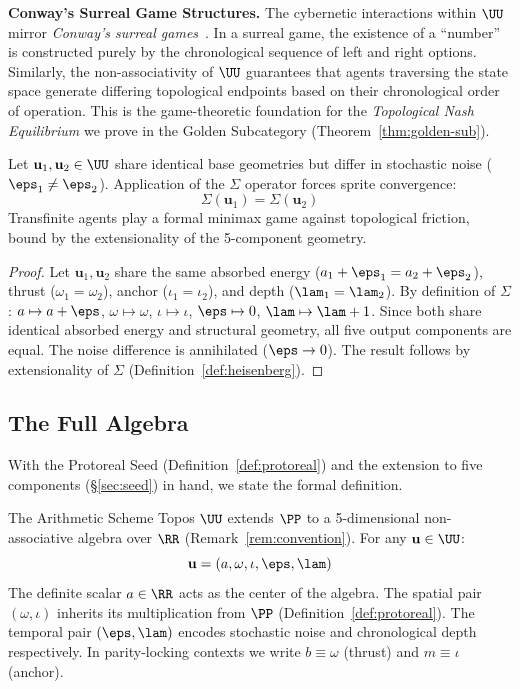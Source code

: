 \textbf{Conway's Surreal Game Structures.} The cybernetic interactions within $\UU$ mirror \emph{Conway's surreal games}~\cite{conway}. In a surreal game, the existence of a ``number'' is constructed purely by the chronological sequence of left and right options. Similarly, the non-associativity of $\UU$ guarantees that agents traversing the state space generate differing topological endpoints based on their chronological order of operation. This is the game-theoretic foundation for the \emph{Topological Nash Equilibrium} we prove in the Golden Subcategory (Theorem~\ref{thm:golden-sub}).

\begin{theorem}\label{thm:game-ext}
Let $\mathbf{u}_1, \mathbf{u}_2 \in \UU$ share identical base geometries but differ in stochastic noise ($\eps_1 \neq \eps_2$). Application of the $\Sigma$ operator forces sprite convergence:
$$\Sigma(\mathbf{u}_1) = \Sigma(\mathbf{u}_2)$$
Transfinite agents play a formal minimax game against topological friction, bound by the extensionality of the 5-component geometry.
\end{theorem}

\begin{proof}
Let $\mathbf{u}_1, \mathbf{u}_2$ share the same absorbed energy ($a_1 + \eps_1 = a_2 + \eps_2$), thrust ($\omega_1 = \omega_2$), anchor ($\iota_1 = \iota_2$), and depth ($\lam_1 = \lam_2$). By definition of $\Sigma$: $a \mapsto a + \eps$, $\omega \mapsto \omega$, $\iota \mapsto \iota$, $\eps \mapsto 0$, $\lam \mapsto \lam + 1$. Since both share identical absorbed energy and structural geometry, all five output components are equal. The noise difference is annihilated ($\eps \to 0$). The result follows by extensionality of $\Sigma$ (Definition~\ref{def:heisenberg}). \qedhere
\end{proof}

\subsection{The Full Algebra}

With the Protoreal Seed (Definition~\ref{def:protoreal}) and the extension to five components (\S\ref{sec:seed}) in hand, we state the formal definition.

\begin{definition}\label{def:heisenberg}
The Arithmetic Scheme Topos $\UU$ extends $\PP$ to a 5-dimensional non-associative algebra over $\RR$ (Remark~\ref{rem:convention}). For any $\mathbf{u} \in \UU$:
$$\mathbf{u} = (a, \omega, \iota, \eps, \lam)$$
The definite scalar $a \in \RR$ acts as the center of the algebra. The spatial pair $(\omega, \iota)$ inherits its multiplication from $\PP$ (Definition~\ref{def:protoreal}). The temporal pair $(\eps, \lam)$ encodes stochastic noise and chronological depth respectively. In parity-locking contexts we write $b \equiv \omega$ (thrust) and $m \equiv \iota$ (anchor).
\end{definition}

